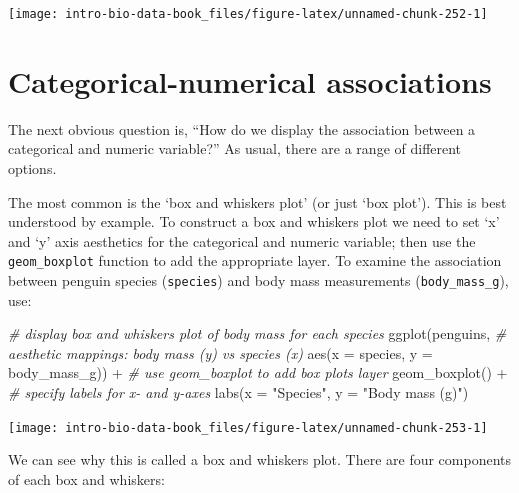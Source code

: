 \documentclass[
]{book}
\newenvironment{Shaded}{\begin{snugshade}}{\end{snugshade}}
\newcommand{\AttributeTok}[1]{\textcolor[rgb]{0.77,0.63,0.00}{#1}}
\newcommand{\CommentTok}[1]{\textcolor[rgb]{0.56,0.35,0.01}{\textit{#1}}}
\newcommand{\FunctionTok}[1]{\textcolor[rgb]{0.00,0.00,0.00}{#1}}
\newcommand{\NormalTok}[1]{#1}
\newcommand{\SpecialCharTok}[1]{\textcolor[rgb]{0.00,0.00,0.00}{#1}}
\newcommand{\StringTok}[1]{\textcolor[rgb]{0.31,0.60,0.02}{#1}}
\begin{document}
\begin{center}\texttt{[image: intro-bio-data-book\_files/figure-latex/unnamed-chunk-252-1]} \end{center}

\hypertarget{cat-num-association}{%
\section{Categorical-numerical associations}\label{cat-num-association}}

The next obvious question is, ``How do we display the association between a categorical and numeric variable?'' As usual, there are a range of different options.

The most common is the `box and whiskers plot' (or just `box plot'). This is best understood by example. To construct a box and whiskers plot we need to set `x' and `y' axis aesthetics for the categorical and numeric variable; then use the \texttt{geom\_boxplot} function to add the appropriate layer. To examine the association between penguin species (\texttt{species}) and body mass measurements (\texttt{body\_mass\_g}), use:

\begin{Shaded}
\begin{Highlighting}[]
\CommentTok{\# display box and whiskers plot of body mass for each species}
\FunctionTok{ggplot}\NormalTok{(penguins, }
       \CommentTok{\# aesthetic mappings: body mass (y) vs species (x)}
       \FunctionTok{aes}\NormalTok{(}\AttributeTok{x =}\NormalTok{ species, }\AttributeTok{y =}\NormalTok{ body\_mass\_g)) }\SpecialCharTok{+}
  \CommentTok{\# use geom\_boxplot to add box plots layer}
  \FunctionTok{geom\_boxplot}\NormalTok{() }\SpecialCharTok{+} 
  \CommentTok{\# specify labels for x{-} and y{-}axes}
  \FunctionTok{labs}\NormalTok{(}\AttributeTok{x =} \StringTok{"Species"}\NormalTok{, }\AttributeTok{y =} \StringTok{"Body mass (g)"}\NormalTok{)}
\end{Highlighting}
\end{Shaded}

\begin{center}\texttt{[image: intro-bio-data-book\_files/figure-latex/unnamed-chunk-253-1]} \end{center}

We can see why this is called a box and whiskers plot. There are four components of each box and whiskers:
\end{document}
